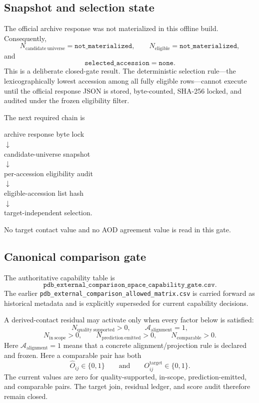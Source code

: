 \subsection{Snapshot and selection state}

The official archive response was not materialized in this offline build. Consequently,
\[
N_{\mathrm{candidate\ universe}}=\texttt{not\_materialized},
\qquad
N_{\mathrm{eligible}}=\texttt{not\_materialized},
\]
and
\[
\texttt{selected\_accession}=\texttt{none}.
\]
This is a deliberate closed-gate result. The deterministic selection rule---the lexicographically lowest accession among all fully eligible rows---cannot execute until the official response JSON is stored, byte-counted, SHA-256 locked, and audited under the frozen eligibility filter.

The next required chain is
\begin{center}
archive response byte lock\\
$\downarrow$\\
candidate-universe snapshot\\
$\downarrow$\\
per-accession eligibility audit\\
$\downarrow$\\
eligible-accession list hash\\
$\downarrow$\\
target-independent selection.
\end{center}
No target contact value and no AOD agreement value is read in this gate.

\subsection{Canonical comparison gate}

The authoritative capability table is
\[
\texttt{pdb\_external\_comparison\_space\_capability\_gate.csv}.
\]
The earlier \texttt{pdb\_external\_comparison\_allowed\_matrix.csv} is carried forward as historical metadata and is explicitly superseded for current capability decisions.

A derived-contact residual may activate only when every factor below is satisfied:
\[
N_{\mathrm{quality\ supported}}>0,
\qquad
\mathcal A_{\mathrm{alignment}}=1,
\]
\[
N_{\mathrm{in\ scope}}>0,
\qquad
N_{\mathrm{prediction\ emitted}}>0,
\qquad
N_{\mathrm{comparable}}>0.
\]
Here $\mathcal A_{\mathrm{alignment}}=1$ means that a concrete alignment/projection rule is declared and frozen.
Here a comparable pair has both
\[
\widehat O_{ij}\in\{0,1\}
\qquad\text{and}\qquad
O^{\mathrm{target}}_{ij}\in\{0,1\}.
\]
The current values are zero for quality-supported, in-scope, prediction-emitted, and comparable pairs. The target join, residual ledger, and score audit therefore remain closed.

